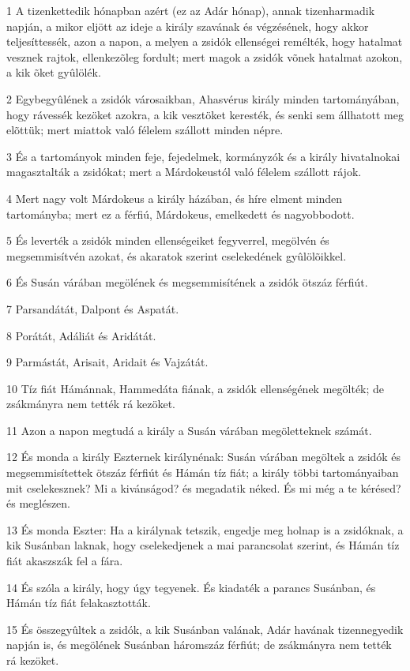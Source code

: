 \par 1 A tizenkettedik hónapban azért (ez az Adár hónap), annak tizenharmadik napján, a mikor eljött az ideje a király szavának és végzésének, hogy akkor teljesíttessék, azon a napon, a melyen a zsidók ellenségei remélték, hogy hatalmat vesznek rajtok, ellenkezõleg fordult; mert magok a zsidók võnek hatalmat azokon, a kik õket gyûlölék.
\par 2 Egybegyûlének a zsidók városaikban, Ahasvérus király minden tartományában, hogy rávessék kezöket azokra, a kik vesztöket keresték, és senki sem állhatott meg elõttük; mert miattok való félelem szállott minden népre.
\par 3 És a tartományok minden feje, fejedelmek, kormányzók és a király hivatalnokai magasztalták a zsidókat; mert a Márdokeustól való félelem szállott rájok.
\par 4 Mert nagy volt Márdokeus a király házában, és híre elment minden tartományba; mert ez a férfiú, Márdokeus, emelkedett és nagyobbodott.
\par 5 És leverték a zsidók minden ellenségeiket fegyverrel, megölvén és megsemmisítvén azokat, és akaratok szerint cselekedének gyûlölõikkel.
\par 6 És Susán várában megölének és megsemmisítének a zsidók ötszáz férfiút.
\par 7 Parsandátát, Dalpont és Aspatát.
\par 8 Porátát, Adáliát és Aridátát.
\par 9 Parmástát, Arisait, Aridait és Vajzátát.
\par 10 Tíz fiát Hámánnak, Hammedáta fiának, a zsidók ellenségének megölték; de zsákmányra nem tették rá kezöket.
\par 11 Azon a napon megtudá a király a Susán várában megöletteknek számát.
\par 12 És monda a király Eszternek királynénak: Susán várában megöltek a zsidók és megsemmisítettek ötszáz férfiút és Hámán tíz fiát; a király többi tartományaiban mit cselekesznek? Mi a kivánságod? és megadatik néked. És mi még a te kérésed? és meglészen.
\par 13 És monda Eszter: Ha a királynak tetszik, engedje meg holnap is a zsidóknak, a kik Susánban laknak, hogy cselekedjenek a mai parancsolat szerint, és Hámán tíz fiát akaszszák fel a fára.
\par 14 És szóla a király, hogy úgy tegyenek. És kiadaték a parancs Susánban, és Hámán tíz fiát felakasztották.
\par 15 És összegyûltek a zsidók, a kik Susánban valának, Adár havának tizennegyedik napján is, és megölének Susánban háromszáz férfiút; de zsákmányra nem tették rá kezöket.
